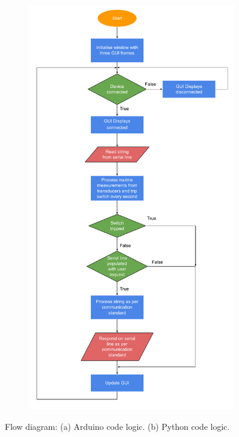 \begin{figure}[h]
\begin{subfigure}[]{0.4\textwidth}
             \centering
  		\includegraphics[width=1.0\linewidth]{./Figures/python_code_flow.pdf}
		   \caption{ } \label{subfig:python_code_flow}
     \end{subfigure}
   \caption[Flow diagram of logic for Arduino and Python code]{Flow diagram: (a) Arduino code logic. (b)  Python code logic.  }
    \label{fig:code_flow}
 \end{figure}





